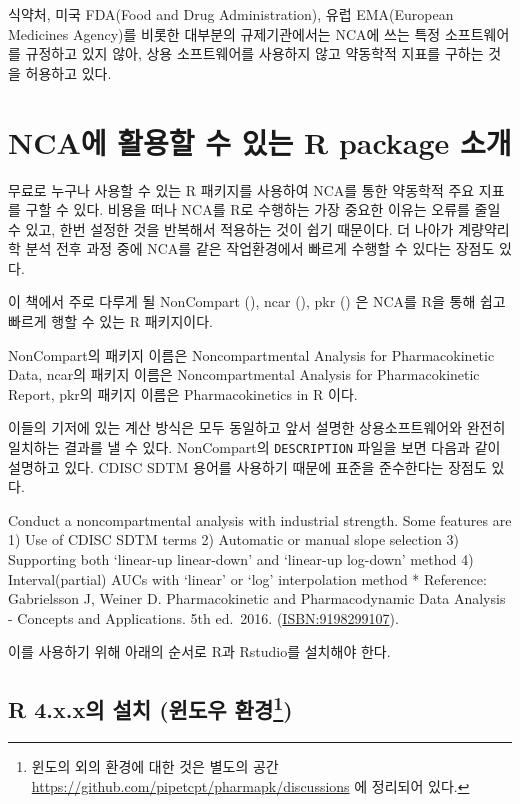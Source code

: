 \documentclass[
  11pt,
  krantz2, a4paper, twoside]{krantz}
\renewenvironment{quote}{\begin{VF}}{\end{VF}}
\theoremstyle{definition}
\theoremstyle{definition}
\theoremstyle{definition}
\theoremstyle{definition}
\theoremstyle{remark}
\begin{document}
식약처, 미국 FDA(Food and Drug Administration), 유럽 EMA(European Medicines Agency)를 비롯한 대부분의 규제기관에서는 NCA에 쓰는 특정 소프트웨어를 규정하고 있지 않아, 상용 소프트웨어를 사용하지 않고 약동학적 지표를 구하는 것을 허용하고 있다.

\section{NCA에 활용할 수 있는 R package 소개}\label{ncauxc5d0-uxd65cuxc6a9uxd560-uxc218-uxc788uxb294-r-package-uxc18cuxac1c}

무료로 누구나 사용할 수 있는 R 패키지를 사용하여 NCA를 통한 약동학적 주요 지표를 구할 수 있다. 비용을 떠나 NCA를 R로 수행하는 가장 중요한 이유는 오류를 줄일 수 있고, 한번 설정한 것을 반복해서 적용하는 것이 쉽기 때문이다. 더 나아가 계량약리학 분석 전후 과정 중에 NCA를 같은 작업환경에서 빠르게 수행할 수 있다는 장점도 있다.

이 책에서 주로 다루게 될 NonCompart (), ncar (), pkr () 은 NCA를 R을 통해 쉽고 빠르게 행할 수 있는 R 패키지이다.

NonCompart의 패키지 이름은 Noncompartmental Analysis for Pharmacokinetic Data,
ncar의 패키지 이름은 Noncompartmental Analysis for Pharmacokinetic Report,
pkr의 패키지 이름은 Pharmacokinetics in R 이다.

이들의 기저에 있는 계산 방식은 모두 동일하고 앞서 설명한 상용소프트웨어와 완전히 일치하는 결과를 낼 수 있다. NonCompart의 \texttt{DESCRIPTION} 파일을 보면 다음과 같이 설명하고 있다. CDISC SDTM 용어를 사용하기 때문에 표준을 준수한다는 장점도 있다.

\begin{quote}
Conduct a noncompartmental analysis with industrial strength.
Some features are
1) Use of CDISC SDTM terms
2) Automatic or manual slope selection
3) Supporting both `linear-up linear-down' and `linear-up log-down' method
4) Interval(partial) AUCs with `linear' or `log' interpolation method
* Reference: Gabrielsson J, Weiner D. Pharmacokinetic and Pharmacodynamic Data Analysis - Concepts and Applications. 5th ed.~2016. (\url{ISBN:9198299107}).
\end{quote}

이를 사용하기 위해 아래의 순서로 R과 Rstudio를 설치해야 한다.

\subsection[R 4.x.x의 설치 (윈도우 환경)]{\texorpdfstring{R 4.x.x의 설치 (윈도우 환경\footnote{윈도의 외의 환경에 대한 것은 별도의 공간 \url{https://github.com/pipetcpt/pharmapk/discussions} 에 정리되어 있다.})}{R 4.x.x의 설치 (윈도우 환경)}}\label{r-4.x.xuxc758-uxc124uxce58-uxc708uxb3c4uxc6b0-uxd658uxacbd}
\end{document}
